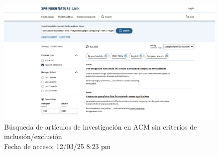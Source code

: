 \begin{figure}[H]
	\centering
	\includegraphics[width=\textwidth,keepaspectratio]{apendices/bases-datos/con-exclusion/springer.png}
	\caption{Búsqueda de artículos de investigación en ACM sin criterios de inclusión/exclusión \\
		Fecha de acceso: 12/03/25 8:23 pm
	}\label{fig:busqueda-springer-con-exclusion}
\end{figure}
